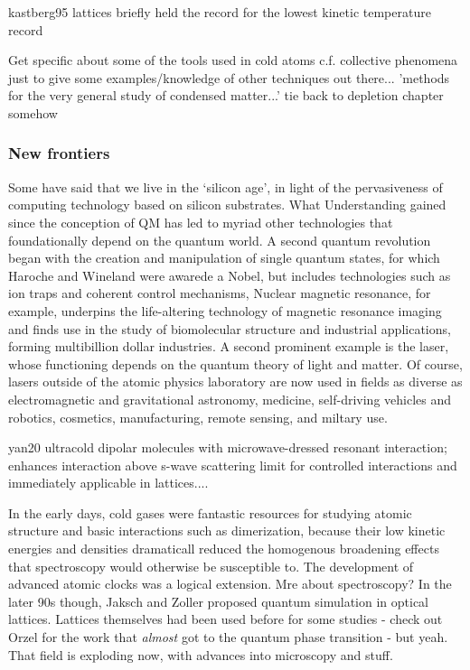 	kastberg95
	lattices briefly held the record for the lowest kinetic temperature record

	Get specific about some of the tools used in cold atoms c.f. collective phenomena just to give some examples/knowledge of other techniques out there... 'methods for the very general study of condensed matter...' tie back to depletion chapter somehow

	\subsubsection{New frontiers}

	Some have said that we live in the `silicon age', in light of the
	pervasiveness of computing technology based on silicon substrates.
	What	Understanding	gained since the conception of QM has led to myriad other technologies	that foundationally depend on the quantum world.
	A second quantum	revolution began with the creation and manipulation of single quantum	states, for which Haroche and Wineland were awarede a Nobel, but	includes technologies such as ion traps and coherent control mechanisms,
	Nuclear magnetic	resonance, for example, underpins the life-altering technology of	magnetic resonance imaging and finds use in the study of biomolecular	structure and industrial applications, forming multibillion dollar	industries.
	A second prominent example is the laser, whose functioning
	depends on the quantum theory of light and matter.
	Of course, lasers outside of	the atomic physics laboratory are now used in fields as diverse	as electromagnetic and gravitational astronomy, medicine, self-driving	vehicles and robotics, cosmetics, manufacturing, remote sensing, and	miltary use.

	yan20 ultracold dipolar molecules with microwave-dressed resonant interaction; enhances interaction above s-wave scattering limit for controlled interactions and immediately applicable in lattices....

	In the early days, cold gases were
	fantastic resources for studying atomic structure and basic interactions
	such as dimerization, because their low kinetic energies and densities
	dramaticall reduced the homogenous broadening effects that spectroscopy
	would otherwise be susceptible to.
	The development of advanced atomic
	clocks was a logical extension.
	Mre about spectroscopy?
	In the later 90s though, Jaksch and
	Zoller proposed quantum simulation in optical lattices.
	Lattices
	themselves had been used before for some studies - check out Orzel for
	the work that \emph{almost} got to the quantum phase transition - but
	yeah.
	That field is exploding now, with advances into microscopy and
	stuff.

